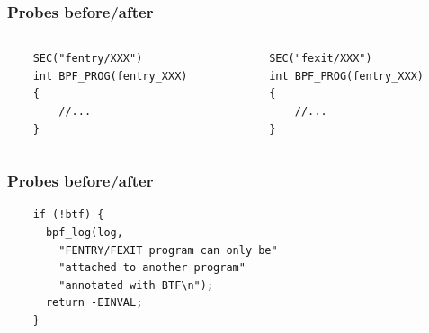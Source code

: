 \documentclass[usenames,dvipsnames, 18pt, compress, aspectratio=169]{beamer}
\begin{document}
\begin{frame}[fragile]{}
    \frametitle{Probes before/after}

    \begin{center}
        \begin{columns}
            \begin{column}{0.5\textwidth}
                \begin{verbatim}
    SEC("fentry/XXX")
    int BPF_PROG(fentry_XXX)
    {
        //...
    }
               \end{verbatim}
           \end{column}

           \begin{column}{0.5\textwidth}
               \begin{verbatim}
    SEC("fexit/XXX")
    int BPF_PROG(fentry_XXX)
    {
        //...
    }
                \end{verbatim}
            \end{column}
        \end{columns}
    \end{center}
\end{frame}

\begin{frame}[fragile]{}
    \frametitle{Probes before/after}

    \begin{center}
        \begin{verbatim}
    if (!btf) {
      bpf_log(log,
        "FENTRY/FEXIT program can only be"
        "attached to another program"
        "annotated with BTF\n");
      return -EINVAL;
    }
        \end{verbatim}
    \end{center}
\end{frame}
\end{document}
